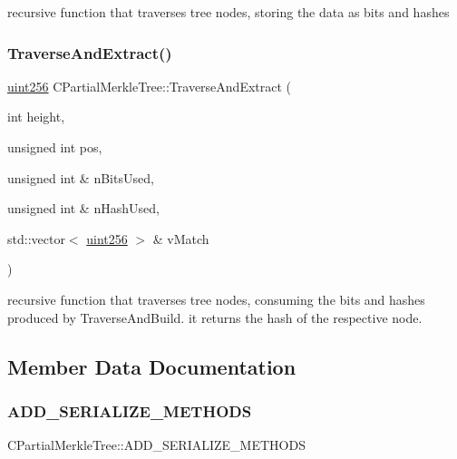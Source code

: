 recursive function that traverses tree nodes, storing the data as bits and hashes \mbox{\label{class_c_partial_merkle_tree_a3ddbe75a92d93059c30f6e60bacc7054}} 
\subsubsection{\texorpdfstring{Traverse\+And\+Extract()}{TraverseAndExtract()}}
{\footnotesize\ttfamily \mbox{\hyperlink{classuint256}{uint256}} C\+Partial\+Merkle\+Tree\+::\+Traverse\+And\+Extract (\begin{DoxyParamCaption}\item[{int}]{height,  }\item[{unsigned int}]{pos,  }\item[{unsigned int \&}]{n\+Bits\+Used,  }\item[{unsigned int \&}]{n\+Hash\+Used,  }\item[{std\+::vector$<$ \mbox{\hyperlink{classuint256}{uint256}} $>$ \&}]{v\+Match }\end{DoxyParamCaption})\hspace{0.3cm}{\ttfamily [protected]}}

recursive function that traverses tree nodes, consuming the bits and hashes produced by Traverse\+And\+Build. it returns the hash of the respective node. 

\subsection{Member Data Documentation}
\mbox{\label{class_c_partial_merkle_tree_ae218db8103edb6672fe0d642535c7490}} 
\subsubsection{\texorpdfstring{A\+D\+D\+\_\+\+S\+E\+R\+I\+A\+L\+I\+Z\+E\+\_\+\+M\+E\+T\+H\+O\+DS}{ADD\_SERIALIZE\_METHODS}}
{\footnotesize\ttfamily C\+Partial\+Merkle\+Tree\+::\+A\+D\+D\+\_\+\+S\+E\+R\+I\+A\+L\+I\+Z\+E\+\_\+\+M\+E\+T\+H\+O\+DS}

